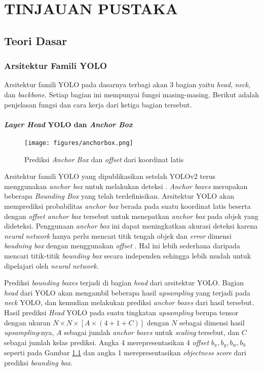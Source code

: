 \chapter{TINJAUAN PUSTAKA}
\section{Teori Dasar}
  \subsection{Arsitektur Famili YOLO}
    Arsitektur famili YOLO pada dasarnya terbagi akan 3 bagian yaitu \emph{head}, \emph{neck}, dan \emph{backbone}.
    Setiap bagian ini mempunyai fungsi masing-masing.
    Berikut adalah penjelasan fungsi dan cara kerja dari ketiga bagian tersebut.
    \subsubsection{\emph{Layer Head} YOLO dan \emph{Anchor Box}}
      \begin{figure}[H]
          \centering
          \texttt{[image: figures/anchorbox.png]}
          \caption{Prediksi \emph{Anchor Box} dan \emph{offset} dari koordinat latis \parencite{yolov3}}
          \label{fig:anchorbox}
      \end{figure}
      Arsitektur famili YOLO yang dipublikasikan setelah YOLOv2 terus menggunakan \emph{anchor box} untuk melakukan deteksi \parencites{yolov2}{yolov3}{yolov4}{scaledyolov4}{yolov5}{yolor}{yolov7}.
      \emph{Anchor boxes} merupakan beberapa \emph{Bounding Box} yang telah terdefinisikan. 
      Arsitektur YOLO akan memprediksi probabilitas \emph{anchor box} berada pada suatu koordinat latis beserta dengan \emph{offset anchor box} tersebut untuk menepatkan \emph{anchor box} pada objek yang dideteksi.
      Penggunaan \emph{anchor box} ini dapat meningkatkan akurasi deteksi karena \emph{neural network} hanya perlu mencari titik tengah objek dan \emph{error} dimensi \emph{boudning box} dengan menggunakan \emph{offset} \parencite{yolov3}.
      Hal ini lebih sederhana daripada mencari titik-titik \emph{bounding box} secara independen sehingga lebih mudah untuk dipelajari oleh \emph{neural network}.
  
      Prediksi \emph{bounding boxes} terjadi di bagian \emph{head} dari arsitektur YOLO.
      Bagian \emph{head} dari YOLO akan mengambil beberapa hasil \emph{upsampling} yang terjadi pada \emph{neck} YOLO, dan kemudian melakukan prediksi \emph{anchor boxes} dari hasil tersebut.
      Hasil prediksi \emph{Head} YOLO pada suatu tingkatan \emph{upsampling} berupa tensor dengan ukuran $N\times N \times [A\times(4+1+C)]$ dengan $N$ sebagai dimensi hasil \emph{upsampling}-nya, $A$ sebagai jumlah \emph{anchor boxes} untuk \emph{scaling} tersebut, dan $C$ sebagai jumlah kelas prediksi.
      Angka 4 merepresentasikan 4 \emph{offset} $b_x, b_y, b_w, b_h$ seperti pada Gambar \ref{fig:anchorbox} dan angka 1 merepresentasikan \emph{objectness score} dari prediksi \emph{bounding box}.
  
